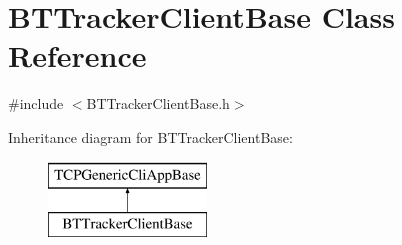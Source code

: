 \hypertarget{classBTTrackerClientBase}{}\section{B\+T\+Tracker\+Client\+Base Class Reference}
\label{classBTTrackerClientBase}


{\ttfamily \#include $<$B\+T\+Tracker\+Client\+Base.\+h$>$}

Inheritance diagram for B\+T\+Tracker\+Client\+Base\+:\begin{figure}[H]
\begin{center}
\leavevmode
\includegraphics[height=2.000000cm]{classBTTrackerClientBase}
\end{center}
\end{figure}
